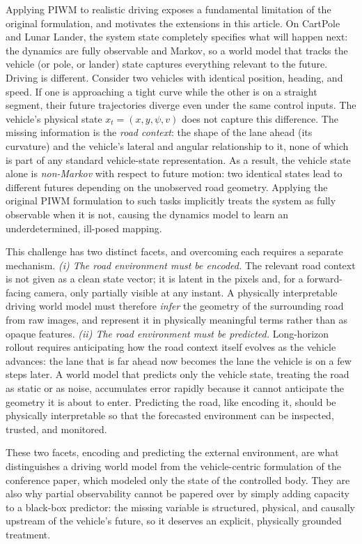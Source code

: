 \documentclass[preprint,12pt]{elsarticle}
\begin{document}
Applying PIWM to realistic driving exposes a fundamental limitation of the
original formulation, and motivates the extensions in this article.
On CartPole and Lunar Lander, the system state completely specifies what will
happen next: the dynamics are fully observable and Markov, so a world model that
tracks the vehicle (or pole, or lander) state captures everything relevant to the
future.
Driving is different.
Consider two vehicles with identical position, heading, and speed.
If one is approaching a tight curve while the other is on a straight segment,
their future trajectories diverge even under the same control inputs.
The vehicle's physical state $x_t = (x, y, \psi, v)$ does not capture this
difference.
The missing information is the \emph{road context}: the shape of the lane ahead
(its curvature) and the vehicle's lateral and angular relationship to it, none of
which is part of any standard vehicle-state representation.
As a result, the vehicle state alone is \emph{non-Markov} with respect to future
motion: two identical states lead to different futures depending on the
unobserved road geometry.
Applying the original PIWM formulation to such tasks implicitly treats the
system as fully observable when it is not, causing the dynamics model to learn an
underdetermined, ill-posed mapping.

This challenge has two distinct facets, and overcoming each requires a separate
mechanism.
\emph{(i) The road environment must be encoded.}
The relevant road context is not given as a clean state vector; it is latent in
the pixels and, for a forward-facing camera, only partially visible at any
instant.
A physically interpretable driving world model must therefore \emph{infer} the
geometry of the surrounding road from raw images, and represent it in physically
meaningful terms rather than as opaque features.
\emph{(ii) The road environment must be predicted.}
Long-horizon rollout requires anticipating how the road context itself evolves as
the vehicle advances: the lane that is far ahead now becomes the lane the vehicle
is on a few steps later.
A world model that predicts only the vehicle state, treating the road as static
or as noise, accumulates error rapidly because it cannot anticipate the geometry
it is about to enter.
Predicting the road, like encoding it, should be physically interpretable so that
the forecasted environment can be inspected, trusted, and monitored.

These two facets, encoding and predicting the external environment, are
what distinguishes a driving world model from the vehicle-centric formulation of
the conference paper, which modeled only the state of the controlled body.
They are also why partial observability cannot be papered over by simply adding
capacity to a black-box predictor: the missing variable is structured, physical,
and causally upstream of the vehicle's future, so it deserves an explicit,
physically grounded treatment.
\end{document}
